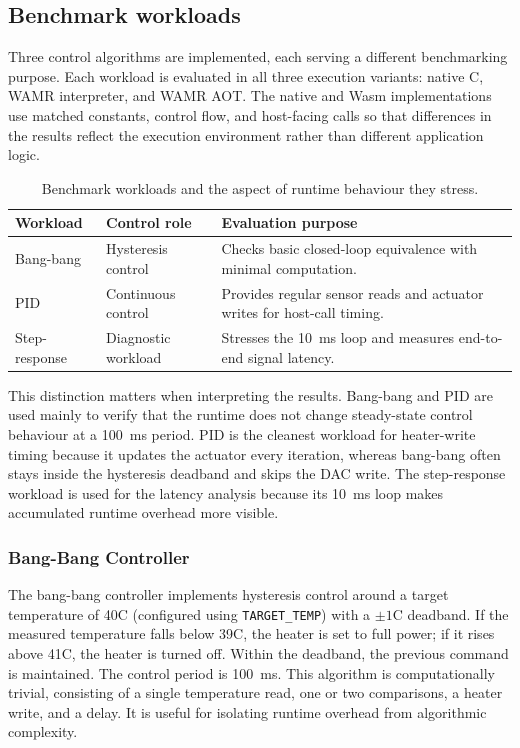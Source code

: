\documentclass[12pt, a4paper]{report}
\begin{document}
\subsection{Benchmark workloads}
\label{sec:algorithms} 

Three control algorithms are implemented, each serving a different benchmarking purpose. Each workload is evaluated in all three execution variants: native C, WAMR interpreter, and WAMR AOT. The native and Wasm implementations use matched constants, control flow, and host-facing calls so that differences in the results reflect the execution environment rather than different application logic.

\begin{table}[htbp]
\centering
\caption{Benchmark workloads and the aspect of runtime behaviour they stress.}
\label{tab:workload-purpose}
\small
\begin{tabular}{@{}lll@{}}
\toprule
\textbf{Workload} & \textbf{Control role} & \textbf{Evaluation purpose} \\
\midrule
Bang-bang & Hysteresis control & Checks basic closed-loop equivalence with minimal computation. \\
PID & Continuous control & Provides regular sensor reads and actuator writes for host-call timing. \\
Step-response & Diagnostic workload & Stresses the 10~ms loop and measures end-to-end signal latency. \\
\bottomrule
\end{tabular}
\end{table}

This distinction matters when interpreting the results. Bang-bang and PID are used mainly to verify that the runtime does not change steady-state control behaviour at a 100~ms period. PID is the cleanest workload for heater-write timing because it updates the actuator every iteration, whereas bang-bang often stays inside the hysteresis deadband and skips the DAC write. The step-response workload is used for the latency analysis because its 10~ms loop makes accumulated runtime overhead more visible.

\subsubsection{Bang-Bang Controller}
\label{subsec:bang-bang}

The bang-bang controller implements hysteresis control around a target temperature of 40\textdegree C (configured using \texttt{TARGET\_TEMP}) with a $\pm 1$\textdegree C deadband. If the measured temperature falls below 39\textdegree C, the heater is set to full power; if it rises above 41\textdegree C, the heater is turned off. Within the deadband, the previous command is maintained. The control period is 100~ms. This algorithm is computationally trivial, consisting of a single temperature read, one or two comparisons, a heater write, and a delay. It is useful for isolating runtime overhead from algorithmic complexity.
\end{document}
